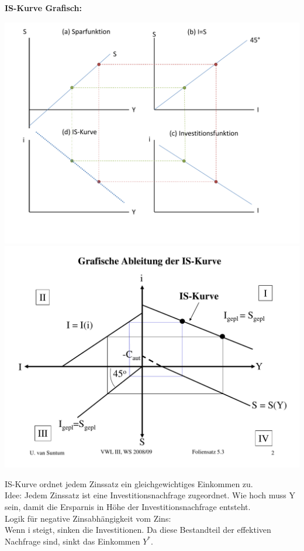 \documentclass{scrartcl}
\begin{document}
\begin{enumerate}[(a)]
\textbf{IS-Kurve Grafisch:}
\begin{center}
  \includegraphics[width=\textwidth]{Bilder/Keynes_IS_Grafisch.pdf}
  \includegraphics[width=\textwidth]{Bilder/Keynes_IS_Grafisch2.pdf}
\end{center}
IS-Kurve ordnet jedem Zinssatz ein gleichgewichtiges Einkommen zu.\\
Idee: Jedem Zinssatz ist eine Investitionsnachfrage zugeordnet. Wie hoch muss Y sein, damit die Ersparnis in H\"{o}he der Investitionsnachfrage entsteht.\\
Logik f\"{u}r negative Zinsabh\"{a}ngigkeit vom Zins:\\
Wenn i steigt, sinken die Investitionen. Da diese Bestandteil der effektiven Nachfrage sind, sinkt das Einkommen $Y^*$.\\


\end{enumerate}
\end{document}
